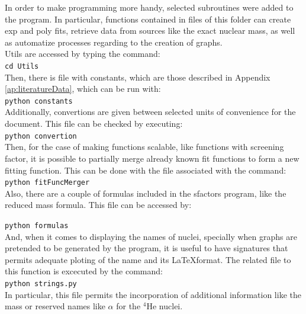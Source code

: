 \documentclass[openany]{book}
\begin{document}
In order to make programming more handy, selected subroutines were added to the program. In particular, functions contained in files of this folder can create exp and poly fits, retrieve data from sources like the exact nuclear mass, as well as automatize processes regarding to the creation of graphs. \\

Utils are accessed by typing the command:   \\

\texttt{cd Utils} \\

Then, there is file with constants, which are those described in Appendix \ref{ap:literatureData},  which can be run with:  \\

\texttt{python constants} \\

Additionally, convertions are given between selected units of convenience for the document. This file can be checked by executing:  \\

\texttt{python convertion} \\

Then, for the case of making functions scalable, like functions with screening factor, it is possible to partially merge already known fit functions to form a new fitting function. This can be done with the file associated with the command: \\

\texttt{python fitFuncMerger} \\

Also, there are a couple of formulas included in the sfactors program, like the reduced mass formula. This file can be accessed by: 

\texttt{python formulas} \\

And, when it comes to displaying the names of nuclei, specially when graphs are pretended to be generated by the program, it is useful to have signatures that permits adequate ploting of the name and its \LaTeX format. The related file to this function is excecuted by the command: \\

\texttt{python strings.py} \\ 

In particular, this file permits the incorporation of additional information like the mass or reserved names like $\alpha$ for the $\mathrm{{}^{4}He}$ nuclei. \\



\newpage


\end{document}
